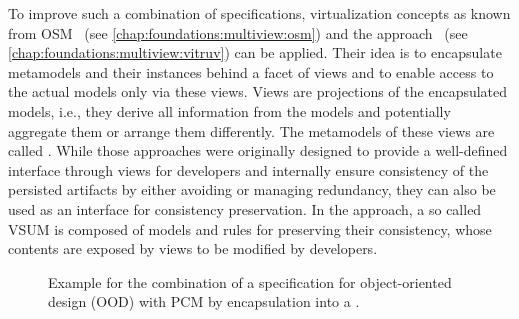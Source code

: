 To improve such a combination of specifications, virtualization concepts as known from \gls{OSM}~\cite{atkinson2010a} (see \autoref{chap:foundations:multiview:osm}) and the \vitruv approach~\cite{klare2020Vitruv-JSS} (see \autoref{chap:foundations:multiview:vitruv}) can be applied.
Their idea is to encapsulate metamodels and their instances behind a facet of views and to enable access to the actual models only via these views.
Views are projections of the encapsulated models, i.e., they derive all information from the models and potentially aggregate them or arrange them differently.
The metamodels of these views are called \emph{\viewtypes}.
While those approaches were originally designed to provide a well-defined interface through views for developers and internally ensure consistency of the persisted artifacts by either avoiding or managing redundancy, they can also be used as an interface for consistency preservation.
In the \vitruv approach, a so called \gls{VSUM} is composed of models and rules for preserving their consistency, whose contents are exposed by views to be modified by developers.

\begin{figure}
    \centering
    
    \caption[Combination of \commonalities with a transformation]{Example for the combination of a \commonalities specification for object-oriented design (OOD) with \gls{PCM} by encapsulation into a \vsumm.}
    \label{fig:improvement:combination_external_metamodel}
\end{figure}

